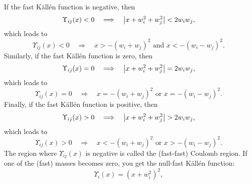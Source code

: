 If the fast K\"{a}ll\'{e}n function is negative, then
\begin{equation}
	\Upsilon_{ij}(x) < 0 \quad \Longrightarrow \quad \left\lvert x + w_{i}^{2} + w_{j}^{2} \right\rvert < 2 w_{i} w_{j},
\end{equation}
which leads to
\begin{equation}
	\Upsilon_{ij}(x) < 0 \quad \Longrightarrow \quad x > -\left(w_{i} + w_{j}\right)^{2} \text{ and } x < -\left(w_{i} - w_{j}\right)^{2}.
\end{equation}
Similarly, if the fast K\"{a}ll\'{e}n function is zero, then
\begin{equation}
	\Upsilon_{ij}(x) = 0 \quad \Longrightarrow \quad \left\lvert x + w_{i}^{2} + w_{j}^{2} \right\rvert = 2 w_{i} w_{j},
\end{equation}
which leads to
\begin{equation}
	\Upsilon_{ij}(x) = 0 \quad \Longrightarrow \quad x = -\left(w_{i} + w_{j}\right)^{2} \text{ or } x = -\left(w_{i} - w_{j}\right)^{2}.
\end{equation}
Finally, if the fast K\"{a}ll\'{e}n function is positive, then
\begin{equation}
	\Upsilon_{ij}(x) > 0 \quad \Longrightarrow \quad \left\lvert x + w_{i}^{2} + w_{j}^{2} \right\rvert > 2 w_{i} w_{j},
\end{equation}
which leads to
\begin{equation}
	\Upsilon_{ij}(x) > 0 \quad \Longrightarrow \quad x < -\left(w_{i} + w_{j}\right)^{2} \text{ or } x > -\left(w_{i} - w_{j}\right)^{2}.
\end{equation}
The region where $\Upsilon_{ij}(x)$ is negative is called the (fast-fast) Coulomb region. If one of the (fast) masses becomes zero, you get the null-fast K\"{a}ll\'{e}n function:
\begin{equation}
	\Upsilon_{i}(x) = \left( x + w_{i}^{2} \right)^{2},
\end{equation}
